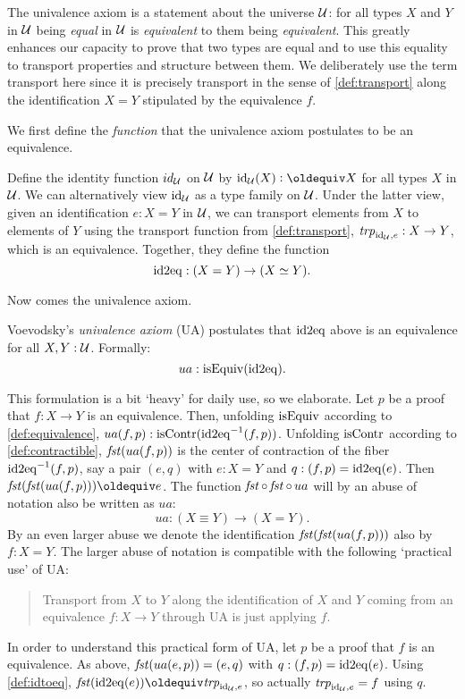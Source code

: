 The univalence axiom is a statement about the universe $\mathcal{U}$: 
for all types $X$ and $Y$ in $\mathcal{U}$ being \emph{equal} in $\mathcal{U}$ is 
\emph{equivalent} to them being \emph{equivalent}. This greatly
enhances our capacity to prove that two types are equal
and to use this equality to transport properties and structure
between them. We deliberately use the term transport
here since it is precisely transport in the sense of
\cref{def:transport} along the identification
$X = Y$ stipulated by the equivalence $f$.

We first define the \emph{function} that
the univalence axiom postulates to be an equivalence.

\begin{definition}\label{def:idtoeq}
Define the identity function $id_{\mathcal{U}}$ on $\mathcal{U}$ by $\id_\UU(X)\defeq X$ 
for all types $X$ in $\mathcal{U}$.
We can alternatively view $\mathord{\mathrm{id}}_{\mathcal{U}}$ as a type family on $\mathcal{U}$. 
Under the latter view,
given an identification $e : X = Y$ in $\mathcal{U}$, we can
transport elements from $X$ to elements of $Y$ using the transport
function from \cref{def:transport},
$\mathord{\mathit{trp}}_{\mathord{\mathrm{id}}_{\mathcal{U}}, e} : X \to Y$, which is an equivalence. 
Together, they define the function
\[
\mathrm{id2eq} : (X = Y) \to (X\simeq Y).
\]
\end{definition}

Now comes the univalence axiom.

\begin{definition}\label{def:univalence}
Voevodsky's \emph{univalence axiom} (UA) postulates that 
$\mathrm{id2eq}$ above is an equivalence for all $X,Y:\mathcal{U}$.
Formally: \[ ua : \mathrm{isEquiv}(\mathrm{id2eq}).\]
\end{definition}

This formulation is a bit `heavy' for daily use,
so we elaborate.
Let $p$ be a proof that $f: X\to Y$ is an equivalence.
Then, unfolding $\mathrm{isEquiv}$ according to \cref{def:equivalence}, 
$ua(f,p): \mathrm{isContr}(\mathrm{id2eq}^{-1}(f,p))$.
Unfolding $\mathrm{isContr}$ according to \cref{def:contractible}, 
$\mathop{\mathit{fst}}(ua(f,p))$ is the center of contraction 
of the fiber $\mathrm{id2eq}^{-1}(f,p)$,
say a pair $(e,q)$ with $e:X=Y$ and $q: (f,p) = \mathrm{id2eq}(e)$.
Then $\fst(\fst(ua(f,p)))\jdeq e$. 
The function $\mathop{\mathit{fst}}\circ\mathop{\mathit{fst}}\circ {\,ua}$ will
by an abuse of notation also be written as $ua$:
\[
ua : (X \equiv Y) \to (X=Y). 
\]
By an even larger abuse we denote the identification
$\mathop{\mathit{fst}}(\mathop{\mathit{fst}}(ua(f,p)))$ also by $f: X=Y$. 
The larger abuse of notation is compatible with the following
`practical use' of UA: 
\begin{quote}
Transport from $X$ to $Y$ along the identification of $X$ and $Y$
coming from an equivalence $f : X\to Y$ through UA is just applying $f$.
\end{quote}
In order to understand this practical form of UA,
let $p$ be a proof that $f$ is an equivalence.
As above, $\mathop{\mathit{fst}}(ua(e,p)) = (e,q)$ with $q: (f,p) = \mathrm{id2eq}(e)$.
Using \cref{def:idtoeq}, $\fst(\idtoeq(e))\jdeq\trp_{\id_\UU, e}$,
so actually $\mathord{\mathit{trp}}_{\mathord{\mathrm{id}}_{\mathcal{U}}, e} =f$ using $q$.

